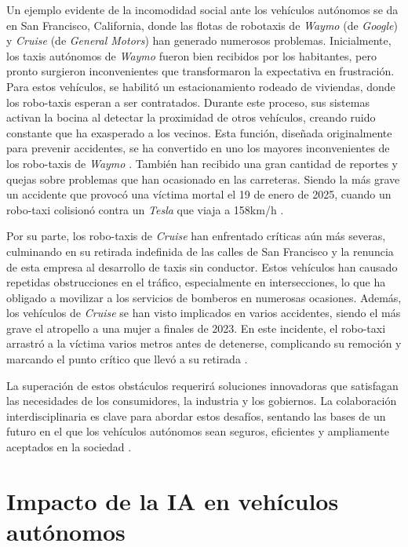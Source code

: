 Un ejemplo evidente de la incomodidad social ante los vehículos autónomos se da en San Francisco, California, donde las flotas de robotaxis de \textit{Waymo} (de \textit{Google}) y \textit{Cruise} (de \textit{General Motors}) han generado numerosos problemas. Inicialmente, los taxis autónomos de \textit{Waymo} fueron bien recibidos por los habitantes, pero pronto surgieron inconvenientes que transformaron la expectativa en frustración. Para estos vehículos, se habilitó un estacionamiento rodeado de viviendas, donde los robo-taxis esperan a ser contratados. Durante este proceso, sus sistemas activan la bocina al detectar la proximidad de otros vehículos, creando ruido constante que ha exasperado a los vecinos. Esta función, diseñada originalmente para prevenir accidentes, se ha convertido en uno los mayores inconvenientes de los robo-taxis de \textit{Waymo} \cite{robotaxis-waymo}. También han recibido una gran cantidad de reportes y quejas sobre problemas que han ocasionado en las carreteras. Siendo la más grave un accidente que provocó una víctima mortal el 19 de enero de 2025, cuando un robo-taxi colisionó contra un \textit{Tesla} que viaja a 158km/h \cite{waymo-wiki}.

Por su parte, los robo-taxis de \textit{Cruise} han enfrentado críticas aún más severas, culminando en su retirada indefinida de las calles de San Francisco y la renuncia de esta empresa al desarrollo de taxis sin conductor. Estos vehículos han causado repetidas obstrucciones en el tráfico, especialmente en intersecciones, lo que ha obligado a movilizar a los servicios de bomberos en numerosas ocasiones. Además, los vehículos de \textit{Cruise} se han visto implicados en varios accidentes, siendo el más grave el atropello a una mujer a finales de 2023. En este incidente, el robo-taxi arrastró a la víctima varios metros antes de detenerse, complicando su remoción y marcando el punto crítico que llevó a su retirada \cite{robotaxis-cruise}.

La superación de estos obstáculos requerirá soluciones innovadoras que satisfagan las necesidades de los consumidores, la industria y los gobiernos. La colaboración interdisciplinaria es clave para abordar estos desafíos, sentando las bases de un futuro en el que los vehículos autónomos sean seguros, eficientes y ampliamente aceptados en la sociedad \cite{challenges-autonomous}.

\section{Impacto de la IA en vehículos autónomos}
\label{sec:ia-intro}

